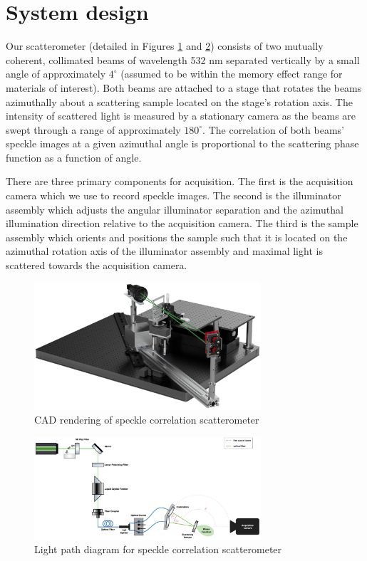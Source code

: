 \section{System design}
Our scatterometer (detailed in Figures \ref{fig:cad} and \ref{fig:light_path}) consists of two mutually coherent, collimated beams of wavelength 532 nm separated vertically by a small angle of approximately $4^\circ$ (assumed to be within the memory effect range for materials of interest). Both beams are attached to a stage that rotates the beams azimuthally about a scattering sample located on the stage's rotation axis. The intensity of scattered light is measured by a stationary camera as the beams are swept through a range of approximately $180^\circ$. The correlation of both beams' speckle images at a given azimuthal angle is proportional to the scattering phase function as a function of angle.

There are three primary components for acquisition. The first is the acquisition camera which we use to record speckle images. The second is the illuminator assembly which adjusts the angular illuminator separation and the azimuthal illumination direction relative to the acquisition camera. The third is the sample assembly which orients and positions the sample such that it is located on the azimuthal rotation axis of the illuminator assembly and maximal light is scattered towards the acquisition camera.
\begin{figure}
    \centering
    \includegraphics[width=0.75\textwidth]{figures/setup.png}
    \caption{CAD rendering of speckle correlation scatterometer}
    \label{fig:cad}
\end{figure}

\begin{figure}
    \centering
    \includegraphics[width=0.75\textwidth]{design/figures/laser_path.png}
    \caption{Light path diagram for speckle correlation scatterometer}
    \label{fig:light_path}
\end{figure}


